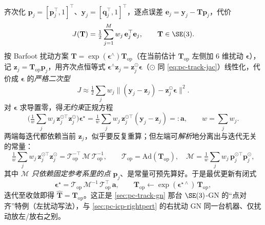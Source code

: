 \begin{derivation}
齐次化 $\boldsymbol{p}_j=[\mathbf{p}_j^\top,1]^\top$、$\boldsymbol{y}_j=[\mathbf{q}_j^\top,1]^\top$，逐点误差 $\mathbf{e}_j=\boldsymbol{y}_j-\mathbf{T}\boldsymbol{p}_j$，代价
\begin{equation}
  J(\mathbf{T})=\tfrac12\sum_{j=1}^{M}w_j\,\mathbf{e}_j^\top\mathbf{e}_j,\qquad \mathbf{T}\in\SE(3).
  \label{eq:pc-se3-cost}
\end{equation}
按 Barfoot 扰动方案 $\mathbf{T}=\exp(\boldsymbol{\epsilon}^\wedge)\mathbf{T}_{\mathrm{op}}$（在当前估计 $\mathbf{T}_{\mathrm{op}}$ 左侧加 $6$ 维扰动 $\boldsymbol{\epsilon}$），记 $\boldsymbol{z}_j=\mathbf{T}_{\mathrm{op}}\boldsymbol{p}_j$，用齐次点恒等式 $\boldsymbol{\epsilon}^\wedge\boldsymbol{z}_j=\boldsymbol{z}_j^{\odot}\boldsymbol{\epsilon}$（$\odot$ 同 \cref{eq:pc-track-jac}）线性化，代价成 $\boldsymbol{\epsilon}$ 的\emph{严格二次型}
\begin{equation}
  J\approx\tfrac12\sum_j w_j\big\|(\boldsymbol{y}_j-\boldsymbol{z}_j)-\boldsymbol{z}_j^{\odot}\boldsymbol{\epsilon}\big\|^2.
\end{equation}
对 $\boldsymbol{\epsilon}$ 求导置零，得\emph{无约束}正规方程
\begin{equation}
  \Big(\tfrac1w\sum_j w_j\,\boldsymbol{z}_j^{\odot\top}\boldsymbol{z}_j^{\odot}\Big)\boldsymbol{\epsilon}^\star
  =\tfrac1w\sum_j w_j\,\boldsymbol{z}_j^{\odot\top}(\boldsymbol{y}_j-\boldsymbol{z}_j)=:\mathbf{a},\qquad w=\textstyle\sum_j w_j.
  \label{eq:pc-se3-normal}
\end{equation}
两端每迭代都依赖当前 $\boldsymbol{z}_j$，似乎要反复重算；但左端可\emph{解析}地分离出与迭代无关的常量：
\begin{equation}
  \tfrac1w\sum_j w_j\,\boldsymbol{z}_j^{\odot\top}\boldsymbol{z}_j^{\odot}
  =\boldsymbol{\mathcal{T}}_{\mathrm{op}}^{-\top}\,\boldsymbol{\mathcal{M}}\,\boldsymbol{\mathcal{T}}_{\mathrm{op}}^{-1},\qquad
  \boldsymbol{\mathcal{T}}_{\mathrm{op}}=\mathrm{Ad}(\mathbf{T}_{\mathrm{op}}),\quad
  \boldsymbol{\mathcal{M}}=\tfrac1w\sum_j w_j\,\boldsymbol{p}_j^{\odot\top}\boldsymbol{p}_j^{\odot},
  \label{eq:pc-se3-M}
\end{equation}
其中 $\boldsymbol{\mathcal{M}}$ \emph{只依赖固定参考系里的点 $\boldsymbol{p}_j$}、是常量可预先算好。于是最优更新有闭式
\begin{equation}
  \boldsymbol{\epsilon}^\star=\boldsymbol{\mathcal{T}}_{\mathrm{op}}\,\boldsymbol{\mathcal{M}}^{-1}\,\boldsymbol{\mathcal{T}}_{\mathrm{op}}^{\top}\,\mathbf{a},\qquad
  \mathbf{T}_{\mathrm{op}}\leftarrow\exp(\boldsymbol{\epsilon}^{\star\wedge})\,\mathbf{T}_{\mathrm{op}},
  \label{eq:pc-se3-eps}
\end{equation}
迭代至收敛即得 $\hat{\mathbf{T}}=\mathbf{T}_{\mathrm{op}}$。这正是 \cref{sec:pc-track-gn} 那台 $\SE(3)$-GN 的“点对齐”特例（左扰动写法），与 \cref{sec:pc-icp-rightpert} 的右扰动 GN 同一台机器、仅扰动放左/放右之别。
\end{derivation}

